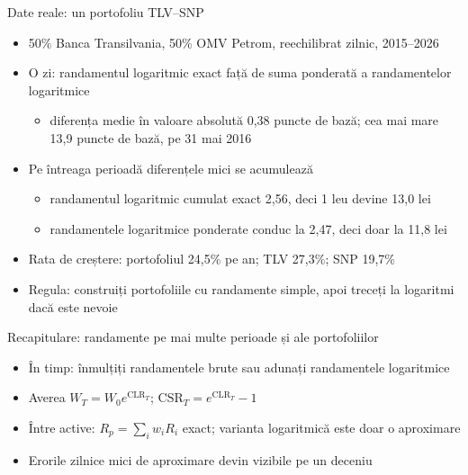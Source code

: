 \begin{frame}{Date reale: un portofoliu TLV--SNP}
\itemsize{\small}
\begin{itemize}
    \item 50\% Banca Transilvania, 50\% OMV Petrom, reechilibrat zilnic, 2015--2026
    \item O zi: randamentul logaritmic exact față de suma ponderată a randamentelor logaritmice
    \begin{itemize}
        \item diferența medie în valoare absolută 0{,}38 puncte de bază; cea mai mare 13{,}9 puncte de bază, pe 31 mai 2016
    \end{itemize}
    \item Pe întreaga perioadă diferențele mici se acumulează
    \begin{itemize}
        \item randamentul logaritmic cumulat exact 2{,}56, deci 1 leu devine 13{,}0 lei
        \item randamentele logaritmice ponderate conduc la 2{,}47, deci doar la 11{,}8 lei
    \end{itemize}
    \item Rata de creștere: portofoliul 24{,}5\% pe an; TLV 27{,}3\%; SNP 19{,}7\%
    \item Regula: construiți portofoliile cu randamente simple, apoi treceți la logaritmi dacă este nevoie
\end{itemize}
\end{frame}

\begin{frame}{Recapitulare: randamente pe mai multe perioade și ale portofoliilor}
\itemsize{\small}
\begin{itemize}
    \item În timp: înmulțiți randamentele brute sau adunați randamentele logaritmice
    \item Averea $W_T = W_0 e^{\text{CLR}_T}$; $\text{CSR}_T = e^{\text{CLR}_T} - 1$
    \item Între active: $R_p = \sum_i w_i R_i$ exact; varianta logaritmică este doar o aproximare
    \item Erorile zilnice mici de aproximare devin vizibile pe un deceniu
\end{itemize}
\end{frame}



